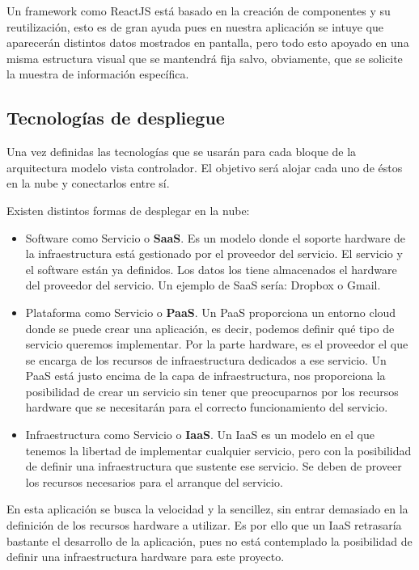 Un framework como ReactJS está basado en la creación de componentes y su reutilización, esto es de gran ayuda pues en nuestra aplicación se intuye que aparecerán distintos datos mostrados en pantalla, pero todo esto apoyado en una misma estructura visual que se mantendrá fija salvo, obviamente, que se solicite la muestra de información específica.

\subsection{Tecnologías de despliegue}

Una vez definidas las tecnologías que se usarán para cada bloque de la arquitectura modelo vista controlador. El objetivo será alojar cada uno de éstos en la nube y conectarlos entre sí. 

Existen distintos formas de desplegar en la nube\cite{cloud}\cite{cloud2}\cite{cloud3}\cite{cloud4}:

\begin{itemize}
    \item Software como Servicio o \textbf{SaaS}. Es un modelo donde el soporte hardware de la infraestructura está gestionado por el proveedor del servicio. El servicio y el software están ya definidos. Los datos los tiene almacenados el  hardware del proveedor del servicio. Un ejemplo de SaaS sería: Dropbox o Gmail.
    \item Plataforma como Servicio o \textbf{PaaS}. Un PaaS proporciona un entorno cloud donde se puede crear una aplicación, es decir, podemos definir qué tipo de servicio queremos implementar. Por la parte hardware, es el proveedor el que se encarga de los recursos de infraestructura dedicados a ese servicio. Un PaaS está justo encima de la capa de infraestructura, nos proporciona la posibilidad de crear un servicio sin tener que preocuparnos por los recursos hardware que se necesitarán para el correcto funcionamiento del servicio.
    \item Infraestructura como Servicio o \textbf{IaaS}. Un IaaS es un modelo en el que tenemos la libertad de implementar cualquier servicio, pero con la posibilidad de definir una infraestructura que sustente ese servicio. Se deben de proveer los recursos necesarios para el arranque del servicio.
\end{itemize}

En esta aplicación se busca la velocidad y la sencillez, sin entrar demasiado en la definición de los recursos hardware a utilizar. Es por ello que un IaaS retrasaría bastante el desarrollo de la aplicación, pues no está contemplado la posibilidad de definir una infraestructura hardware para este proyecto.

